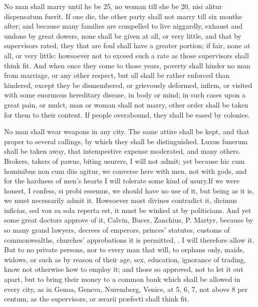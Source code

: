{No man shall marry until he be 25, no woman till she be 20, 
nisi alitur dispensatum fuerit. If one die, the other party shall
not marry till six months after; and because many families are
compelled to live niggardly, exhaust and undone by great dowers,
none shall be given at all, or very little, and that by
supervisors rated, they that are foul shall have a greater portion; if
fair, none at all, or very little: howsoever not to exceed such a
rate as those supervisors shall think fit. And when once they come to
those years, poverty shall hinder no man from marriage, or any other
respect, but all shall be rather enforced than hindered,
except they be dismembered, or grievously deformed, infirm,
or visited with some enormous hereditary disease, in body or mind; in
such cases upon a great pain, or mulct, man or woman shall not
marry, other order shall be taken for them to their content. If people
overabound, they shall be eased by colonies.

No man shall wear weapons in any city. The same attire shall be
kept, and that proper to several callings, by which they shall be
distinguished. Luxus funerum shall be taken away, that
intempestive expense moderated, and many others. Brokers, takers of
pawns, biting usurers, I will not admit; yet because hic cum hominibus
non cum diis agitur, we converse here with men, not with gods, and for
the hardness of men's hearts I will tolerate some kind of usury.If
we were honest, I confess, si probi essemus, we should have no use of
it, but being as it is, we must necessarily admit it. Howsoever most
divines contradict it, dicimus inficias, sed vox ea sola reperta est,
it must be winked at by politicians. And yet some great doctors approve
of it, Calvin, Bucer, Zanchius, P. Martyr, because by so many grand
lawyers, decrees of emperors, princes' statutes, customs of
commonwealths, churches' approbations it is permitted, \etc{}. I will
therefore allow it. But to no private persons, nor to every man that
will, to orphans only, maids, widows, or such as by reason of their
age, sex, education, ignorance of trading, know not otherwise how to
employ it; and those so approved, not to let it out apart, but to bring
their money to a common bank which shall be allowed in every city,
as in Genoa, Geneva, Nuremberg, Venice, at 5, 6, 7, not above 8
per centum, as the supervisors, or \ae{}rarii pr\ae{}fecti shall think fit.

}
